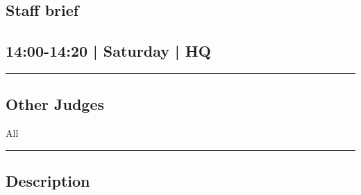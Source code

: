 \documentclass[10pt, A5]{article}
\begin{document}
	

		\begin{framed}
			\begin{minipage}{\textwidth}

			\setcounter{section}{44}
							\section{Staff brief}
						
			\subsection*{14:00-14:20 | Saturday | HQ}

			\vspace{0.25cm}
			\hrule
			\vspace{0.25cm}


			\subsection*{Other Judges}
							All

					\vspace{0.25cm}
			\hrule
			\vspace{0.25cm}

			\begin{minipage}{\textwidth}
			\subsection*{\faListAlt \: Description}
			
			\end{minipage}


	\end{minipage}
	\end{framed}

	
\end{document}
